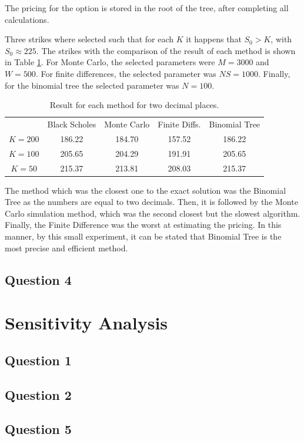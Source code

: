 \documentclass[11pt]{article}
\theoremstyle{definition}
\theoremstyle{remark}
\theoremstyle{remark}
\begin{document}
The pricing for the option is stored in the root of the tree, after completing
all calculations.

Three strikes where selected such that for each $K$ it happens that $S_0 > K$,
with $S_0 \approx 225$. The strikes with the comparison of the result of each
method is shown in Table \ref{tab:comp1}. For Monte Carlo, the selected
parameters were $M=3000$ and $W=500$. For finite differences, the selected
parameter was $NS = 1000$. Finally, for the binomial tree the selected parameter
was $N=100$.

\begin{table}[H]
\centering
\begin{tabular}{ccccc}
\hline
        & Black Scholes & Monte Carlo & Finite Diffs. & Binomial Tree \\
$K=200$ & 186.22        & 184.70      & 157.52        & 186.22        \\
$K=100$ & 205.65        & 204.29      & 191.91        & 205.65        \\
$K=50$  & 215.37        & 213.81      & 208.03        & 215.37        \\ \hline
\end{tabular}
\caption{Result for each method for two decimal places.}
\label{tab:comp1}
\end{table}

The method which was the closest one to the exact solution was the Binomial Tree
as the numbers are equal to two decimals. Then, it is followed by the Monte
Carlo simulation method, which was the second closest but the slowest algorithm.
Finally, the Finite Difference was the worst at estimating the pricing. In this
manner, by this small experiment, it can be stated that Binomial Tree is the
most precise and efficient method.

\subsection{Question 4}


\section{Sensitivity Analysis}

\subsection{Question 1}


\subsection{Question 2}


\subsection{Question 5}


\printbibliography
\end{document}
